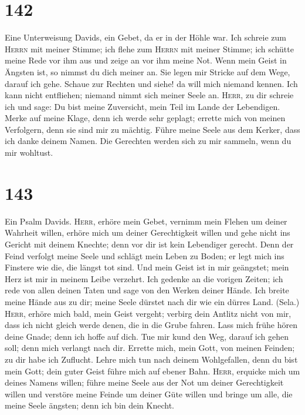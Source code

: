 \hypertarget{section-141}{%
\section{142}\label{section-141}}

 Eine Unterweisung Davids, ein Gebet, da er in der Höhle
war.  Ich schreie zum \textsc{Herrn} mit meiner Stimme;
ich flehe zum \textsc{Herrn} mit meiner Stimme;  ich
schütte meine Rede vor ihm aus und zeige an vor ihm meine Not.
 Wenn mein Geist in Ängsten ist, so nimmst du dich meiner
an. Sie legen mir Stricke auf dem Wege, darauf ich gehe. 
Schaue zur Rechten und siehe! da will mich niemand kennen. Ich kann
nicht entfliehen; niemand nimmt sich meiner Seele an. 
\textsc{Herr}, zu dir schreie ich und sage: Du bist meine Zuversicht,
mein Teil im Lande der Lebendigen.  Merke auf meine Klage,
denn ich werde sehr geplagt; errette mich von meinen Verfolgern, denn
sie sind mir zu mächtig.  Führe meine Seele aus dem
Kerker, dass ich danke deinem Namen. Die Gerechten werden sich zu mir
sammeln, wenn du mir wohltust.

\hypertarget{section-142}{%
\section{143}\label{section-142}}

 Ein Psalm Davids. \textsc{Herr}, erhöre mein Gebet,
vernimm mein Flehen um deiner Wahrheit willen, erhöre mich um deiner
Gerechtigkeit willen  und gehe nicht ins Gericht mit
deinem Knechte; denn vor dir ist kein Lebendiger gerecht. 
Denn der Feind verfolgt meine Seele und schlägt mein Leben zu Boden; er
legt mich ins Finstere wie die, die längst tot sind.  Und
mein Geist ist in mir geängstet; mein Herz ist mir in meinem Leibe
verzehrt.  Ich gedenke an die vorigen Zeiten; ich rede von
allen deinen Taten und sage von den Werken deiner Hände. 
Ich breite meine Hände aus zu dir; meine Seele dürstet nach dir wie ein
dürres Land. (Sela.)  \textsc{Herr}, erhöre mich bald,
mein Geist vergeht; verbirg dein Antlitz nicht von mir, dass ich nicht
gleich werde denen, die in die Grube fahren.  Lass mich
frühe hören deine Gnade; denn ich hoffe auf dich. Tue mir kund den Weg,
darauf ich gehen soll; denn mich verlangt nach dir. 
Errette mich, mein Gott, von meinen Feinden; zu dir habe ich Zuflucht.
 Lehre mich tun nach deinem Wohlgefallen, denn du bist
mein Gott; dein guter Geist führe mich auf ebener Bahn. 
\textsc{Herr}, erquicke mich um deines Namens willen; führe meine Seele
aus der Not um deiner Gerechtigkeit willen  und verstöre
meine Feinde um deiner Güte willen und bringe um alle, die meine Seele
ängsten; denn ich bin dein Knecht.

